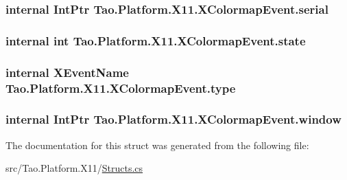 \label{struct_tao_1_1_platform_1_1_x11_1_1_x_colormap_event_a59a9eb53b303ce80bcab0926041802a2}
\hypertarget{struct_tao_1_1_platform_1_1_x11_1_1_x_colormap_event_acb6b25da4ca9fda215cfdca9a1710826}{
\subsubsection[{serial}]{\setlength{\rightskip}{0pt plus 5cm}internal IntPtr {\bf Tao.Platform.X11.XColormapEvent.serial}}}
\label{struct_tao_1_1_platform_1_1_x11_1_1_x_colormap_event_acb6b25da4ca9fda215cfdca9a1710826}
\hypertarget{struct_tao_1_1_platform_1_1_x11_1_1_x_colormap_event_a06d2248e835e08304655e930dc27dfdc}{
\subsubsection[{state}]{\setlength{\rightskip}{0pt plus 5cm}internal int {\bf Tao.Platform.X11.XColormapEvent.state}}}
\label{struct_tao_1_1_platform_1_1_x11_1_1_x_colormap_event_a06d2248e835e08304655e930dc27dfdc}
\hypertarget{struct_tao_1_1_platform_1_1_x11_1_1_x_colormap_event_a885be1d6b81430427eb346df34a8cc7c}{
\subsubsection[{type}]{\setlength{\rightskip}{0pt plus 5cm}internal {\bf XEventName} {\bf Tao.Platform.X11.XColormapEvent.type}}}
\label{struct_tao_1_1_platform_1_1_x11_1_1_x_colormap_event_a885be1d6b81430427eb346df34a8cc7c}
\hypertarget{struct_tao_1_1_platform_1_1_x11_1_1_x_colormap_event_a2a3fe9af623899eac01a7f2f66d8c6f5}{
\subsubsection[{window}]{\setlength{\rightskip}{0pt plus 5cm}internal IntPtr {\bf Tao.Platform.X11.XColormapEvent.window}}}
\label{struct_tao_1_1_platform_1_1_x11_1_1_x_colormap_event_a2a3fe9af623899eac01a7f2f66d8c6f5}


The documentation for this struct was generated from the following file:\begin{DoxyCompactItemize}
\item 
src/Tao.Platform.X11/\hyperlink{_structs_8cs}{Structs.cs}\end{DoxyCompactItemize}
